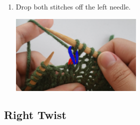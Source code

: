 \documentclass[12pt]{article}
\begin{document}
\begin{multicols}{2}
\begin{enumerate}
\item Drop both stitches off the left needle.

\includegraphics[width=2.5in]{lt_step5.jpg}
\end{enumerate}
\end{multicols}

\newpage

\subsection*{Right Twist}
\end{document}

